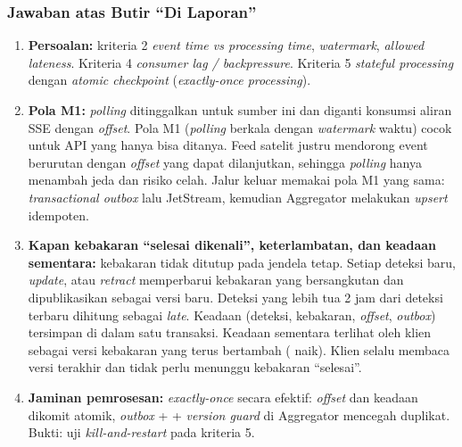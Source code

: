 \subsubsection{Jawaban atas Butir ``Di Laporan''}
\begin{enumerate}
\item \textbf{Persoalan:} kriteria 2 \textit{event time vs processing time}, \textit{watermark}, \textit{allowed lateness}. Kriteria 4 \textit{consumer lag / backpressure}. Kriteria 5 \textit{stateful processing} dengan \textit{atomic checkpoint} (\textit{exactly-once processing}).
\item \textbf{Pola M1:} \textit{polling} ditinggalkan untuk sumber ini dan diganti konsumsi aliran SSE dengan \textit{offset}. Pola M1 (\textit{polling} berkala dengan \textit{watermark} waktu) cocok untuk API yang hanya bisa ditanya. Feed satelit justru mendorong event berurutan dengan \textit{offset} yang dapat dilanjutkan, sehingga \textit{polling} hanya menambah jeda dan risiko celah. Jalur keluar memakai pola M1 yang sama: \textit{transactional outbox} lalu JetStream, kemudian Aggregator melakukan \textit{upsert} idempoten.
\item \textbf{Kapan kebakaran ``selesai dikenali'', keterlambatan, dan keadaan sementara:} kebakaran tidak ditutup pada jendela tetap. Setiap deteksi baru, \textit{update}, atau \textit{retract} memperbarui kebakaran yang bersangkutan dan dipublikasikan sebagai versi baru. Deteksi yang lebih tua 2 jam dari deteksi terbaru dihitung sebagai \textit{late}. Keadaan (deteksi, kebakaran, \textit{offset}, \textit{outbox}) tersimpan di  dalam satu transaksi. Keadaan sementara terlihat oleh klien sebagai versi kebakaran yang terus bertambah ( naik). Klien selalu membaca versi terakhir dan tidak perlu menunggu kebakaran ``selesai''.
\item \textbf{Jaminan pemrosesan:} \textit{exactly-once} secara efektif: \textit{offset} dan keadaan dikomit atomik, \textit{outbox} +  + \textit{version guard} di Aggregator mencegah duplikat. Bukti: uji \textit{kill-and-restart} pada kriteria 5.
\end{enumerate}
